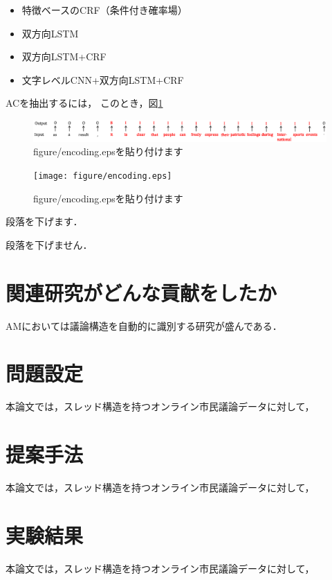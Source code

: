 \documentclass[a4j,fleqn,10pt]{jarticle}
\begin{document}
\begin{itemize}
  \setlength{\parskip}{0cm} %
  \setlength{\itemsep}{0cm} %
  \item 特徴ベースのCRF（条件付き確率場）
  \item 双方向LSTM
  \item 双方向LSTM+CRF
  \item 文字レベルCNN+双方向LSTM+CRF
\end{itemize}

\par
ACを抽出するには，
このとき，図\ref{fig:bio}

\begin{figure}[t]
\begin{center}
\includegraphics[width=\linewidth]{figure/bio.eps}
\end{center}
\caption{figure/encoding.epsを貼り付けます}
\label{fig:bio}
\end{figure}

\begin{figure}[t]
\begin{center}
\texttt{[image: figure/encoding.eps]}
\end{center}
\caption{figure/encoding.epsを貼り付けます}
\label{fig:encoding}
\end{figure}

\par
段落を下げます．



\noindent
段落を下げません．


\section{関連研究がどんな貢献をしたか}
AMにおいては議論構造を自動的に識別する研究が盛んである．


\section{問題設定}
本論文では，スレッド構造を持つオンライン市民議論データに対して，

\section{提案手法}
本論文では，スレッド構造を持つオンライン市民議論データに対して，

\section{実験結果}
本論文では，スレッド構造を持つオンライン市民議論データに対して，


\footnotesize


\end{document}
